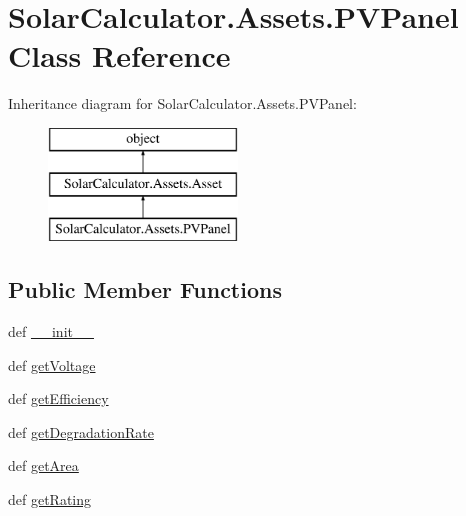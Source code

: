\hypertarget{class_solar_calculator_1_1_assets_1_1_p_v_panel}{\section{Solar\-Calculator.\-Assets.\-P\-V\-Panel Class Reference}
\label{class_solar_calculator_1_1_assets_1_1_p_v_panel}
}
Inheritance diagram for Solar\-Calculator.\-Assets.\-P\-V\-Panel\-:\begin{figure}[H]
\begin{center}
\leavevmode
\includegraphics[height=3.000000cm]{class_solar_calculator_1_1_assets_1_1_p_v_panel}
\end{center}
\end{figure}
\subsection*{Public Member Functions}
\begin{DoxyCompactItemize}
\item 
def \hyperlink{class_solar_calculator_1_1_assets_1_1_p_v_panel_acfa23f0dbaa4f2bcab8193f73927457e}{\-\_\-\-\_\-init\-\_\-\-\_\-}
\item 
def \hyperlink{class_solar_calculator_1_1_assets_1_1_p_v_panel_ae758b2aa840d8e5aa5392d3ad64a6acd}{get\-Voltage}
\item 
def \hyperlink{class_solar_calculator_1_1_assets_1_1_p_v_panel_ab3486f50e44a83ae0927af9d7c154fa1}{get\-Efficiency}
\item 
def \hyperlink{class_solar_calculator_1_1_assets_1_1_p_v_panel_a34f8feae0e59560d86ee8ef5489bbbb7}{get\-Degradation\-Rate}
\item 
def \hyperlink{class_solar_calculator_1_1_assets_1_1_p_v_panel_a9caf20415733cae4d0757ed7069aa03e}{get\-Area}
\item 
def \hyperlink{class_solar_calculator_1_1_assets_1_1_p_v_panel_aeb516103506c7ad5233bb3b951e2c153}{get\-Rating}
\end{DoxyCompactItemize}
